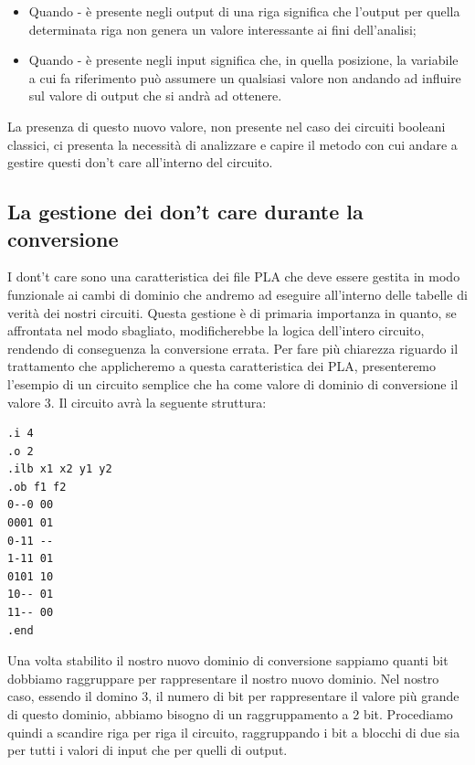 \documentclass[italian,]{book}
\providecommand{\tightlist}{%
  \setlength{\itemsep}{0pt}\setlength{\parskip}{0pt}}
\begin{document}
\begin{itemize}
\tightlist
\item
  Quando - è presente negli output di una riga significa che l'output per quella determinata riga non genera un valore interessante ai fini dell'analisi;
\item
  Quando - è presente negli input significa che, in quella posizione, la variabile a cui fa riferimento può assumere un qualsiasi valore non andando ad influire sul valore di output che si andrà ad ottenere.
\end{itemize}

La presenza di questo nuovo valore, non presente nel caso dei circuiti booleani classici, ci presenta la necessità di analizzare e capire il metodo con cui andare a gestire questi don't care all'interno del circuito.

\hypertarget{la-gestione-dei-dont-care-durante-la-conversione}{%
\subsection{La gestione dei don't care durante la conversione}\label{la-gestione-dei-dont-care-durante-la-conversione}}

I dont't care sono una caratteristica dei file PLA che deve essere gestita in modo funzionale ai cambi di dominio che andremo ad eseguire all'interno delle tabelle di verità dei nostri circuiti. Questa gestione è di primaria importanza in quanto, se affrontata nel modo sbagliato, modificherebbe la logica dell'intero circuito, rendendo di conseguenza la conversione errata. Per fare più chiarezza riguardo il trattamento che applicheremo a questa caratteristica dei PLA, presenteremo l'esempio di un circuito semplice che ha come valore di dominio di conversione il valore 3. Il circuito avrà la seguente struttura:

\begin{verbatim}
.i 4
.o 2
.ilb x1 x2 y1 y2
.ob f1 f2
0--0 00    
0001 01
0-11 --
1-11 01
0101 10
10-- 01
11-- 00
.end
\end{verbatim}

\newpage

Una volta stabilito il nostro nuovo dominio di conversione sappiamo quanti bit dobbiamo raggruppare per rappresentare il nostro nuovo dominio. Nel nostro caso, essendo il domino 3, il numero di bit per rappresentare il valore più grande di questo dominio, abbiamo bisogno di un raggruppamento a 2 bit. Procediamo quindi a scandire riga per riga il circuito, raggruppando i bit a blocchi di due sia per tutti i valori di input che per quelli di output.
\end{document}
